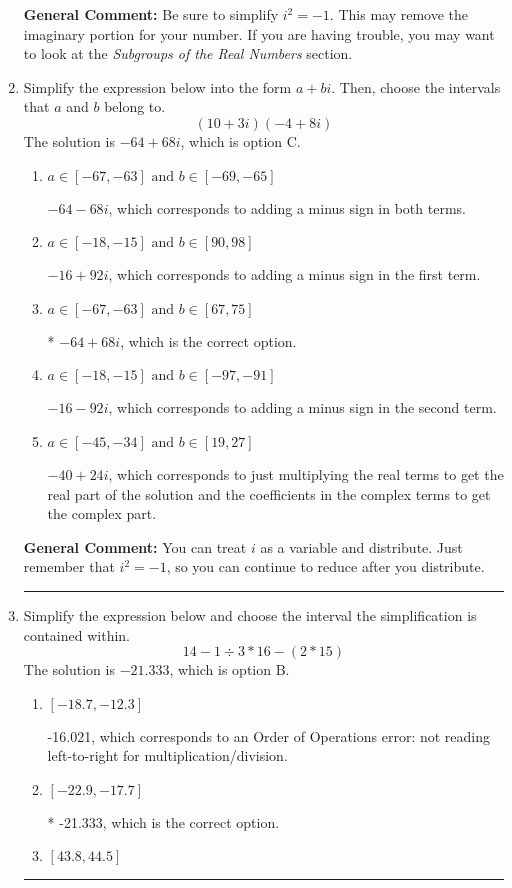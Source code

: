 \documentclass{extbook}[14pt]
\newcommand{\litem}[1]{\item #1

\rule{\textwidth}{0.4pt}}
\begin{document}
\begin{enumerate}
{\textbf{General Comment:} Be sure to simplify $i^2 = -1$. This may remove the imaginary portion for your number. If you are having trouble, you may want to look at the \textit{Subgroups of the Real Numbers} section.
}
\litem{
Simplify the expression below into the form $a+bi$. Then, choose the intervals that $a$ and $b$ belong to.
\[ (10 + 3 i)(-4 + 8 i) \]The solution is \( -64 + 68 i \), which is option C.\begin{enumerate}[label=\Alph*.]
\item \( a \in [-67, -63] \text{ and } b \in [-69, -65] \)

 $-64 - 68 i$, which corresponds to adding a minus sign in both terms.
\item \( a \in [-18, -15] \text{ and } b \in [90, 98] \)

 $-16 + 92 i$, which corresponds to adding a minus sign in the first term.
\item \( a \in [-67, -63] \text{ and } b \in [67, 75] \)

* $-64 + 68 i$, which is the correct option.
\item \( a \in [-18, -15] \text{ and } b \in [-97, -91] \)

 $-16 - 92 i$, which corresponds to adding a minus sign in the second term.
\item \( a \in [-45, -34] \text{ and } b \in [19, 27] \)

 $-40 + 24 i$, which corresponds to just multiplying the real terms to get the real part of the solution and the coefficients in the complex terms to get the complex part.
\end{enumerate}

\textbf{General Comment:} You can treat $i$ as a variable and distribute. Just remember that $i^2=-1$, so you can continue to reduce after you distribute.
}
\litem{
Simplify the expression below and choose the interval the simplification is contained within.
\[ 14 - 1 \div 3 * 16 - (2 * 15) \]The solution is \( -21.333 \), which is option B.\begin{enumerate}[label=\Alph*.]
\item \( [-18.7, -12.3] \)

 -16.021, which corresponds to an Order of Operations error: not reading left-to-right for multiplication/division.
\item \( [-22.9, -17.7] \)

* -21.333, which is the correct option.
\item \( [43.8, 44.5] \)


\end{enumerate}}
\end{enumerate}
\end{document}
